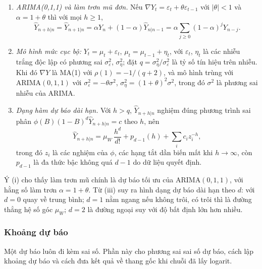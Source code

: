 \begin{kq}
\begin{enumerate}[label=(\roman*),leftmargin=*,itemsep=1pt]
\item \emph{ARIMA(0,1,1) và làm trơn mũ đơn.} Nếu $\nabla Y_t=\varepsilon_t+\theta\varepsilon_{t-1}$ với $|\theta|<1$ và $\alpha=1+\theta$ thì với mọi $h\ge1$,
\[
\hat Y_{n+h|n}=\hat Y_{n+1|n}=\alpha Y_n+(1-\alpha)\hat Y_{n|n-1}=\alpha\sum_{j\ge0}(1-\alpha)^jY_{n-j}.
\]
\item \emph{Mô hình mức cục bộ:} $Y_t=\mu_t+\varepsilon_t$, $\mu_t=\mu_{t-1}+\eta_t$, với $\varepsilon_t$, $\eta_t$ là các nhiễu trắng độc lập có phương sai $\sigma_\varepsilon^2$, $\sigma_\eta^2$; đặt $q=\sigma_\eta^2/\sigma_\varepsilon^2$ là tỷ số tín hiệu trên nhiễu. Khi đó $\nabla Y$ là MA(1) với $\rho(1)=-1/(q+2)$, và mô hình trùng với ARIMA$(0,1,1)$ với $\sigma_\varepsilon^2=-\theta\sigma^2$, $\sigma_\eta^2=(1+\theta)^2\sigma^2$, trong đó $\sigma^2$ là phương sai nhiễu của ARIMA.
\item \emph{Dạng hàm dự báo dài hạn.} Với $h>q$, $\hat Y_{n+h|n}$ nghiệm đúng phương trình sai phân $\phi(B)(1-B)^d\hat Y_{n+h|n}=c$ theo $h$, nên
\[
\hat Y_{n+h|n}=\mu_W\,\frac{h^d}{d!}+p_{d-1}(h)+\sum_ic_iz_i^{-h},
\]
trong đó $z_i$ là các nghiệm của $\phi$, các hạng tắt dần biến mất khi $h\to\infty$, còn $p_{d-1}$ là đa thức bậc không quá $d-1$ do dữ liệu quyết định.
\end{enumerate}
\end{kq}
Ý (i) cho thấy làm trơn mũ chính là dự báo tối ưu của ARIMA$(0,1,1)$, với hằng số làm trơn $\alpha=1+\theta$. Từ (iii) suy ra hình dạng dự báo dài hạn theo $d$: với $d=0$ quay về trung bình; $d=1$ nằm ngang nếu không trôi, có trôi thì là đường thẳng hệ số góc $\mu_W$; $d=2$ là đường ngoại suy với độ bất định lớn hơn nhiều.

\subsubsection{Khoảng dự báo}

Một dự báo luôn đi kèm sai số. Phần này cho phương sai sai số dự báo, cách lập khoảng dự báo và cách đưa kết quả về thang gốc khi chuỗi đã lấy logarit.

